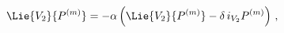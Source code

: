 \begin{equation*}
  \Lie{V_2}{P^{(m)}} =-\alpha \left(\Lie{V_{2}}{P^{(m)}} - \delta\,
  i_{V_{2}}P^{(m)}\right)\,,
\end{equation*}

